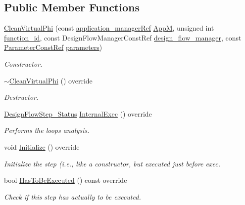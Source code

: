 \subsection*{Public Member Functions}
\begin{DoxyCompactItemize}
\item 
\hyperlink{classCleanVirtualPhi_a472074d8b1ac84804cf1d8c727f2ff65}{Clean\+Virtual\+Phi} (const \hyperlink{application__manager_8hpp_a04ccad4e5ee401e8934306672082c180}{application\+\_\+manager\+Ref} \hyperlink{classFrontendFlowStep_a0ac0d8db2a378416583f51c4faa59d15}{AppM}, unsigned int \hyperlink{classFunctionFrontendFlowStep_a58ef2383ad1a212a8d3f396625a4b616}{function\+\_\+id}, const Design\+Flow\+Manager\+Const\+Ref \hyperlink{classDesignFlowStep_ab770677ddf087613add30024e16a5554}{design\+\_\+flow\+\_\+manager}, const \hyperlink{Parameter_8hpp_a37841774a6fcb479b597fdf8955eb4ea}{Parameter\+Const\+Ref} \hyperlink{classDesignFlowStep_a802eaafe8013df706370679d1a436949}{parameters})
\begin{DoxyCompactList}\small\item\em Constructor. \end{DoxyCompactList}\item 
\hyperlink{classCleanVirtualPhi_a820f799a7d098747a6f0e5f3fd623374}{$\sim$\+Clean\+Virtual\+Phi} () override
\begin{DoxyCompactList}\small\item\em Destructor. \end{DoxyCompactList}\item 
\hyperlink{design__flow__step_8hpp_afb1f0d73069c26076b8d31dbc8ebecdf}{Design\+Flow\+Step\+\_\+\+Status} \hyperlink{classCleanVirtualPhi_aa42a723e56786320db6ba7539aa719ab}{Internal\+Exec} () override
\begin{DoxyCompactList}\small\item\em Performs the loops analysis. \end{DoxyCompactList}\item 
void \hyperlink{classCleanVirtualPhi_a591498af926bbd5368338f97c45c5e2a}{Initialize} () override
\begin{DoxyCompactList}\small\item\em Initialize the step (i.\+e., like a constructor, but executed just before exec. \end{DoxyCompactList}\item 
bool \hyperlink{classCleanVirtualPhi_add0ec70cbdefe63144501ea17de2f5a5}{Has\+To\+Be\+Executed} () const override
\begin{DoxyCompactList}\small\item\em Check if this step has actually to be executed. \end{DoxyCompactList}\end{DoxyCompactItemize}
